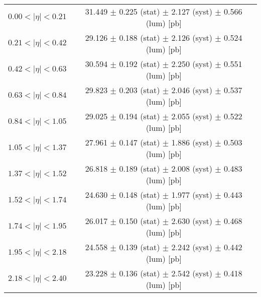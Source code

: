 \begin{tabular}{lc}
\hline
$0.00 < |\eta| <0.21$          & 31.449 $\pm$ 0.225 (stat) $\pm$ 2.127 (syst) $\pm$ 0.566 (lum) [pb]  \\
$0.21 < |\eta| <0.42$          & 29.126 $\pm$ 0.188 (stat) $\pm$ 2.126 (syst) $\pm$ 0.524 (lum) [pb]  \\
$0.42 < |\eta| <0.63$          & 30.594 $\pm$ 0.192 (stat) $\pm$ 2.250 (syst) $\pm$ 0.551 (lum) [pb]  \\
$0.63 < |\eta| <0.84$          & 29.823 $\pm$ 0.203 (stat) $\pm$ 2.046 (syst) $\pm$ 0.537 (lum) [pb]  \\
$0.84 < |\eta| <1.05$          & 29.025 $\pm$ 0.194 (stat) $\pm$ 2.055 (syst) $\pm$ 0.522 (lum) [pb]  \\
$1.05 < |\eta| <1.37$          & 27.961 $\pm$ 0.147 (stat) $\pm$ 1.886 (syst) $\pm$ 0.503 (lum) [pb]  \\
$1.37 < |\eta| <1.52$          & 26.818 $\pm$ 0.189 (stat) $\pm$ 2.008 (syst) $\pm$ 0.483 (lum) [pb]  \\
$1.52 < |\eta| <1.74$          & 24.630 $\pm$ 0.148 (stat) $\pm$ 1.977 (syst) $\pm$ 0.443 (lum) [pb]  \\
$1.74 < |\eta| <1.95$          & 26.017 $\pm$ 0.150 (stat) $\pm$ 2.630 (syst) $\pm$ 0.468 (lum) [pb]  \\
$1.95 < |\eta| <2.18$          & 24.558 $\pm$ 0.139 (stat) $\pm$ 2.242 (syst) $\pm$ 0.442 (lum) [pb]  \\
$2.18 < |\eta| <2.40$          & 23.228 $\pm$ 0.136 (stat) $\pm$ 2.542 (syst) $\pm$ 0.418 (lum) [pb]  \\
\hline
\end{tabular}
